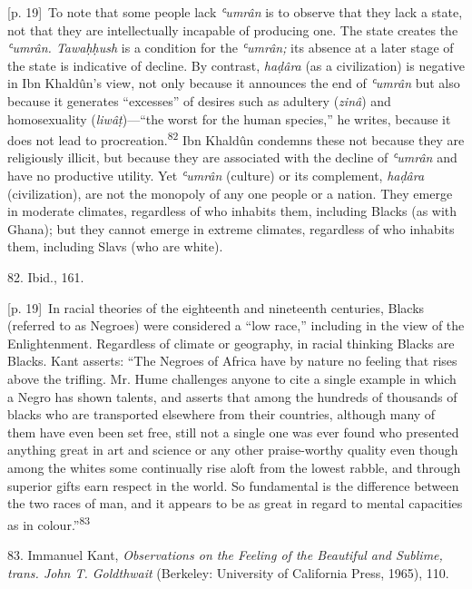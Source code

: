 \documentclass[10pt,a4paper]{article}
\begin{document}
{\scriptsize\color{gray} [p. 19]}\ To note that some people lack \textit{ʿumrân} is to observe that they lack a state, not that they are intellectually incapable of producing one. The state creates the \textit{ʿumrân. Tawaḥḥush} is a condition for the \textit{ʿumrân;} its absence at a later stage of the state is indicative of decline. By contrast, \textit{haḍâra} (as a civilization) is negative in Ibn Khaldûn’s view, not only because it announces the end of \textit{ʿumrân} but also because it generates “excesses” of desires such as adultery (\textit{zinâ}) and homosexuality (\textit{liwâṭ})—“the worst for the human species,” he writes, because it does not lead to procreation.\nobreak\textsuperscript{82} Ibn Khaldûn condemns these not because they are religiously illicit, but because they are associated with the decline of \textit{ʿumrân} and have no productive utility. Yet \textit{ʿumrân} (culture) or its complement, \textit{haḍâra} (civilization), are not the monopoly of any one people or a nation. They emerge in moderate climates, regardless of who inhabits them, including Blacks (as with Ghana); but they cannot emerge in extreme climates, regardless of who inhabits them, including Slavs (who are white).\par{\small 82. Ibid., 161.\par}
{\scriptsize\color{gray} [p. 19]}\ In racial theories of the eighteenth and nineteenth centuries, Blacks (referred to as Negroes) were considered a “low race,” including in the view of the Enlightenment. Regardless of climate or geography, in racial thinking Blacks are Blacks. Kant asserts: “The Negroes of Africa have by nature no feeling that rises above the trifling. Mr. Hume challenges anyone to cite a single example in which a Negro has shown talents, and asserts that among the hundreds of thousands of blacks who are transported elsewhere from their countries, although many of them have even been set free, still not a single one was ever found who presented anything great in art and science or any other praise-worthy quality even though among the whites some continually rise aloft from the lowest rabble, and through superior gifts earn respect in the world. So fundamental is the difference between the two races of man, and it appears to be as great in regard to mental capacities as in colour.”\nobreak\textsuperscript{83}\par{\small 83. Immanuel Kant, \textit{Observations on the Feeling of the Beautiful and Sublime, trans. John T. Goldthwait} (Berkeley: University of California Press, 1965), 110.\par}
\end{document}
